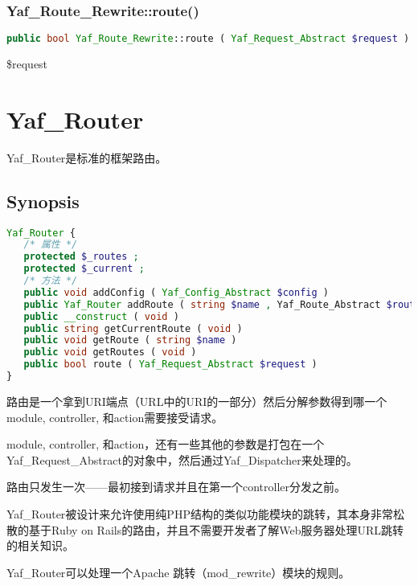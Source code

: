 \subsection{Yaf\_Route\_Rewrite::route()}







\begin{lstlisting}[language=PHP]
public bool Yaf_Route_Rewrite::route ( Yaf_Request_Abstract $request )
\end{lstlisting}

\begin{compactitem}
\item \$request
\end{compactitem}

\chapter{Yaf\_Router}

Yaf\_Router是标准的框架路由。


\section{Synopsis}

\begin{lstlisting}[language=PHP]
Yaf_Router {
   /* 属性 */
   protected $_routes ;
   protected $_current ;
   /* 方法 */
   public void addConfig ( Yaf_Config_Abstract $config )
   public Yaf_Router addRoute ( string $name , Yaf_Route_Abstract $route )
   public __construct ( void )
   public string getCurrentRoute ( void )
   public void getRoute ( string $name )
   public void getRoutes ( void )
   public bool route ( Yaf_Request_Abstract $request )
}
\end{lstlisting}

路由是一个拿到URI端点（URL中的URI的一部分）然后分解参数得到哪一个module, controller, 和action需要接受请求。

module, controller, 和action，还有一些其他的参数是打包在一个Yaf\_Request\_Abstract的对象中，然后通过Yaf\_Dispatcher来处理的。

路由只发生一次——最初接到请求并且在第一个controller分发之前。

Yaf\_Router被设计来允许使用纯PHP结构的类似功能模块的跳转，其本身非常松散的基于Ruby on Rails的路由，并且不需要开发者了解Web服务器处理URL跳转的相关知识。

Yaf\_Router可以处理一个Apache 跳转（mod\_rewrite）模块的规则。


